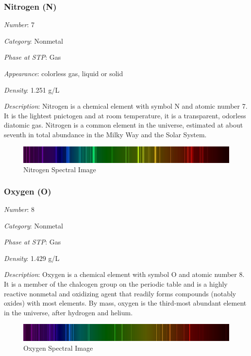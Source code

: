 \documentclass{article}
\begin{document}
\hypertarget{subsubsection::N}{}\subsubsection{Nitrogen (N)}

\textit{Number}: 7

\textit{Category}: Nonmetal

\textit{Phase at STP}: Gas

\textit{Appearance}: colorless gas, liquid or solid

\textit{Density}: 1.251 g/L

\textit{Description}: Nitrogen is a chemical element with symbol N and atomic number 7. It is the lightest pnictogen and at room temperature, it is a transparent, odorless diatomic gas. Nitrogen is a common element in the universe, estimated at about seventh in total abundance in the Milky Way and the Solar System.

\immediate{}
\begin{figure}[!ht]
    \centering
    \includegraphics[width=12cm]{./resources/spectral_img/Nitrogen_Spectra.jpg}
    \caption{Nitrogen Spectral Image}
\end{figure}

\hypertarget{subsubsection::O}{}\subsubsection{Oxygen (O)}

\textit{Number}: 8

\textit{Category}: Nonmetal

\textit{Phase at STP}: Gas

\textit{Density}: 1.429 g/L

\textit{Description}: Oxygen is a chemical element with symbol O and atomic number 8. It is a member of the chalcogen group on the periodic table and is a highly reactive nonmetal and oxidizing agent that readily forms compounds (notably oxides) with most elements. By mass, oxygen is the third-most abundant element in the universe, after hydrogen and helium.

\immediate{}
\begin{figure}[!ht]
    \centering
    \includegraphics[width=12cm]{./resources/spectral_img/Oxygen_spectre.jpg}
    \caption{Oxygen Spectral Image}
\end{figure}
\end{document}
